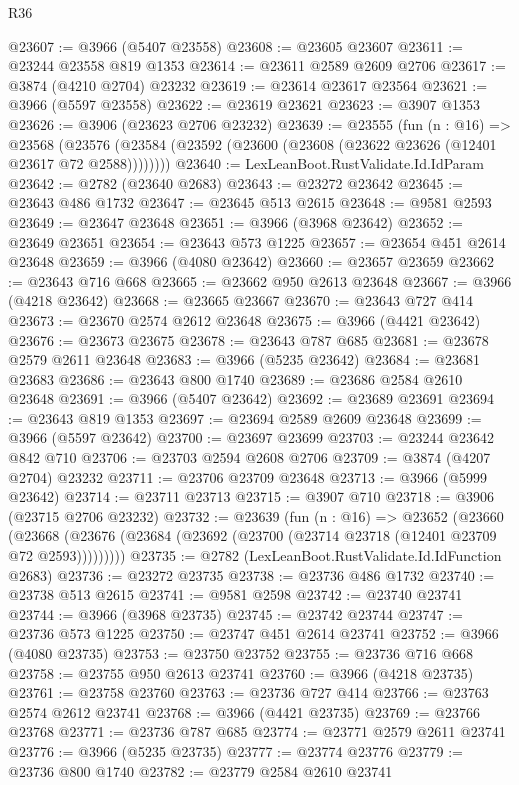 \begin{lexlean}{R36}
\begin{coremodule}
@23607 := @3966 (@5407 @23558)
@23608 := @23605 @23607
@23611 := @23244 @23558 @819 @1353
@23614 := @23611 @2589 @2609 @2706
@23617 := @3874 (@4210 @2704) @23232
@23619 := @23614 @23617 @23564
@23621 := @3966 (@5597 @23558)
@23622 := @23619 @23621
@23623 := @3907 @1353
@23626 := @3906 (@23623 @2706 @23232)
@23639 := @23555
    (fun (n : @16) =>
    @23568 (@23576 (@23584 (@23592 (@23600 (@23608 (@23622 @23626 (@12401 @23617 @72 @2588))))))))
@23640 := LexLeanBoot.RustValidate.Id.IdParam
@23642 := @2782 (@23640 @2683)
@23643 := @23272 @23642
@23645 := @23643 @486 @1732
@23647 := @23645 @513 @2615
@23648 := @9581 @2593
@23649 := @23647 @23648
@23651 := @3966 (@3968 @23642)
@23652 := @23649 @23651
@23654 := @23643 @573 @1225
@23657 := @23654 @451 @2614 @23648
@23659 := @3966 (@4080 @23642)
@23660 := @23657 @23659
@23662 := @23643 @716 @668
@23665 := @23662 @950 @2613 @23648
@23667 := @3966 (@4218 @23642)
@23668 := @23665 @23667
@23670 := @23643 @727 @414
@23673 := @23670 @2574 @2612 @23648
@23675 := @3966 (@4421 @23642)
@23676 := @23673 @23675
@23678 := @23643 @787 @685
@23681 := @23678 @2579 @2611 @23648
@23683 := @3966 (@5235 @23642)
@23684 := @23681 @23683
@23686 := @23643 @800 @1740
@23689 := @23686 @2584 @2610 @23648
@23691 := @3966 (@5407 @23642)
@23692 := @23689 @23691
@23694 := @23643 @819 @1353
@23697 := @23694 @2589 @2609 @23648
@23699 := @3966 (@5597 @23642)
@23700 := @23697 @23699
@23703 := @23244 @23642 @842 @710
@23706 := @23703 @2594 @2608 @2706
@23709 := @3874 (@4207 @2704) @23232
@23711 := @23706 @23709 @23648
@23713 := @3966 (@5999 @23642)
@23714 := @23711 @23713
@23715 := @3907 @710
@23718 := @3906 (@23715 @2706 @23232)
@23732 := @23639
    (fun (n : @16) =>
    @23652
      (@23660
        (@23668 (@23676 (@23684 (@23692 (@23700 (@23714 @23718 (@12401 @23709 @72 @2593)))))))))
@23735 := @2782 (LexLeanBoot.RustValidate.Id.IdFunction @2683)
@23736 := @23272 @23735
@23738 := @23736 @486 @1732
@23740 := @23738 @513 @2615
@23741 := @9581 @2598
@23742 := @23740 @23741
@23744 := @3966 (@3968 @23735)
@23745 := @23742 @23744
@23747 := @23736 @573 @1225
@23750 := @23747 @451 @2614 @23741
@23752 := @3966 (@4080 @23735)
@23753 := @23750 @23752
@23755 := @23736 @716 @668
@23758 := @23755 @950 @2613 @23741
@23760 := @3966 (@4218 @23735)
@23761 := @23758 @23760
@23763 := @23736 @727 @414
@23766 := @23763 @2574 @2612 @23741
@23768 := @3966 (@4421 @23735)
@23769 := @23766 @23768
@23771 := @23736 @787 @685
@23774 := @23771 @2579 @2611 @23741
@23776 := @3966 (@5235 @23735)
@23777 := @23774 @23776
@23779 := @23736 @800 @1740
@23782 := @23779 @2584 @2610 @23741

\end{coremodule}
\end{lexlean}
